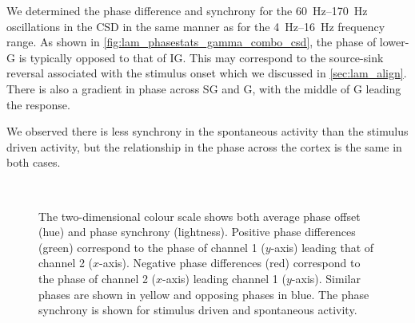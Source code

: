 

We determined the phase difference and synchrony for the \SIrange{60}{170}{Hz} oscillations in the \ac{CSD} in the same manner as for the \SIrange{4}{16}{Hz} frequency range.
As shown in \autoref{fig:lam_phasestats_gamma_combo_csd}, the phase of lower-\ac{G} is typically opposed to that of \ac{IG}.
This may correspond to the source-sink reversal associated with the stimulus onset which we discussed in \autoref{sec:lam_align}.
There is also a gradient in phase across \ac{SG} and \ac{G}, with the middle of \ac{G} leading the response.

We observed there is less synchrony in the spontaneous activity than the stimulus driven activity, but the relationship in the phase across the cortex is the same in both cases.

\begin{figure}[tbp]
    \centering
    \\
\caption{
The two-dimensional colour scale shows both average phase offset (hue) and phase synchrony (lightness).
Positive phase differences (green) correspond to the phase of channel 1 ($y$-axis) leading that of channel 2 ($x$-axis).
Negative phase differences (red) correspond to the phase of channel 2 ($x$-axis) leading channel 1 ($y$-axis).
Similar phases are shown in yellow and opposing phases in blue.
The phase synchrony is shown for stimulus driven \protect{} and spontaneous \protect{} activity.
}
\label{fig:lam_phasestats_gamma_combo_csd}
\end{figure}


